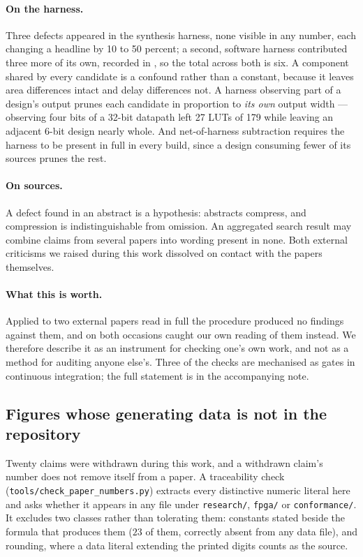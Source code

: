 \paragraph{On the harness.} Three defects appeared in the synthesis harness, none
visible in any number, each changing a headline by 10 to 50 percent; a second,
software harness contributed three more of its own, recorded in
, so the total across both is six. A component shared by every
candidate is a confound rather than a constant, because it leaves area
differences intact and delay differences not. A harness observing part of a
design's output prunes each candidate in proportion to \emph{its own} output
width --- observing four bits of a 32-bit datapath left 27 LUTs of 179 while
leaving an adjacent 6-bit design nearly whole. And net-of-harness subtraction
requires the harness to be present in full in every build, since a design
consuming fewer of its sources prunes the rest.

\paragraph{On sources.} A defect found in an abstract is a hypothesis: abstracts
compress, and compression is indistinguishable from omission. An aggregated
search result may combine claims from several papers into wording present in
none. Both external criticisms we raised during this work dissolved on contact
with the papers themselves.


\paragraph{What this is worth.} Applied to two external papers read in full the
procedure produced no findings against them, and on both occasions caught our own
reading of them instead. We
therefore describe it as an instrument for checking one's own work, and not as a
method for auditing anyone else's. Three of the checks are mechanised as gates in
continuous integration; the full statement is in the accompanying note.





\subsection{Figures whose generating data is not in the repository}
\label{sec:provenance}
Twenty claims were withdrawn during this work, and a withdrawn claim's number
does not remove itself from a paper. A traceability check
(\texttt{tools/\allowbreak check\_\allowbreak paper\_\allowbreak numbers.py}) extracts every distinctive numeric
literal here and asks whether it appears in any file under \texttt{research/},
\texttt{fpga/} or \texttt{conformance/}. It excludes two classes rather than
tolerating them: constants stated beside the formula that produces them ($23$ of
them, correctly absent from any data file), and rounding, where a data literal
extending the printed digits counts as the source.

